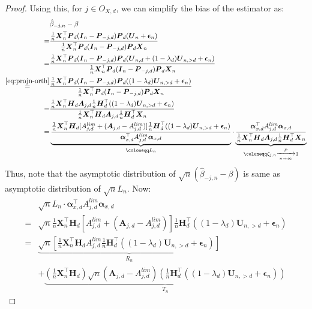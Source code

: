 \documentclass[
  12pt]{article}
\newcommand{\pnlim}{\xrightarrow[n \to \infty]{P}}
\newcommand{\bX}{\boldsymbol{X}}
\newcommand{\balp}{\boldsymbol{\alpha}}
\newcommand{\bA}{\boldsymbol{A}}
\newcommand{\bU}{\boldsymbol{U}}
\newcommand{\bP}{\boldsymbol{P}}
\newcommand{\bI}{\boldsymbol{I}}
\newcommand{\beps}{\boldsymbol{\epsilon}}
\newcommand{\bH}{\boldsymbol{H}}
\begin{document}
\begin{proof}
Using this, for $j \in O_{X,d}$, we can simplify the bias of the estimator as:
\begin{equation}\label{eq:bias-drop}
    \begin{split}
        & \hat{\beta}_{-j,n} - \beta\\
        = & \dfrac{\frac{1}{n}\bX_{n}^\top\bP_d(\bI_n - \bP_{-j,d})\bP_d(\bU_n + \beps_n)}{\frac{1}{n}\bX_{n}^\top\bP_d(\bI_n - \bP_{-j,d})\bP_d\bX_{n}}\\
        = & \dfrac{\frac{1}{n}\bX_{n}^\top\bP_d(\bI_n - \bP_{-j,d})\bP_d(\bU_{n,d} + (1 - \lambda_{d})\bU_{n,>d} + \beps_n)}{\frac{1}{n}\bX_{n}^\top\bP_d(\bI_n - \bP_{-j,d})\bP_d\bX_{n}}\\
        \overset{\ref{eq:projn-orth}}{=} & \dfrac{\frac{1}{n}\bX_{n}^\top\bP_d(\bI_n - \bP_{-j,d})\bP_d((1 - \lambda_{d})\bU_{n,>d} + \beps_n)}{\frac{1}{n}\bX_{n}^\top\bP_d(\bI_n - \bP_{-j,d})\bP_d\bX_{n}}\\
        = & \dfrac{\frac{1}{n}\bX_{n}^\top\bH_{d} \bA_{j,d}\frac{1}{n}\bH_{d}^\top((1 - \lambda_{d})\bU_{n,>d} + \beps_n)}{\frac{1}{n}\bX_{n}^\top\bH_{d} \bA_{j,d}\frac{1}{n}\bH_{d}^\top\bX_{n}}\\
        = & \underbrace{\dfrac{\frac{1}{n}\bX_{n}^\top\bH_{d} [A^{lim}_{j,d} + (\bA_{j,d} - A^{lim}_{j,d})]\frac{1}{n}\bH_{d}^\top((1 - \lambda_{d})\bU_{n,>d} + \beps_n)}{\balp_{x,d}^\top A^{lim}_{j,d}\balp_{x,d}}}_{\coloneqq L_n}\cdot \underbrace{\frac{\balp_{x,d}^\top A^{lim}_{j,d}\balp_{x,d}}{\frac{1}{n}\bX_{n}^\top\bH_{d} \bA_{j,d}\frac{1}{n}\bH_{d}^\top\bX_{n}}}_{\coloneqq \zeta_{j,n}\pnlim 1}\\
    \end{split}
\end{equation}
Thus, note that the asymptotic distribution of  $\sqrt{n}\left(\hat{\beta}_{-j,n} - \beta\right)$ is same as asymptotic distribution of $\sqrt{n}L_n$. Now:
$$
\begin{aligned}
    & \sqrt{n}L_n \cdot \balp_{x,d}^\top A^{lim}_{j,d}\balp_{x,d}\\
    =& \sqrt{n}\frac{1}{n}\bX_{n}^\top\bH_{d} [A^{lim}_{j,d} + (\bA_{j,d} - A^{lim}_{j,d})]\frac{1}{n}\bH_{d}^\top((1 - \lambda_{d})\bU_{n,>d} + \beps_n)\\
    = & \underbrace{\sqrt{n}\left[\frac{1}{n}\bX_{n}^\top\bH_{d}A^{lim}_{j,d}\frac{1}{n}\bH_{d}^\top((1 - \lambda_{d})\bU_{n,>d} + \beps_n)\right]}_{R_{n}}\\
    &+\underbrace{\left(\frac{1}{n}\bX_{n}^\top\bH_{d}\right)\sqrt{n}(\bA_{j,d} - A^{lim}_{j,d})\left(\frac{1}{n}\bH_{d}^\top((1 - \lambda_{d})\bU_{n,>d} + \beps_n)\right)}_{T_{n}}

\end{aligned}$$
\end{proof}
\end{document}
